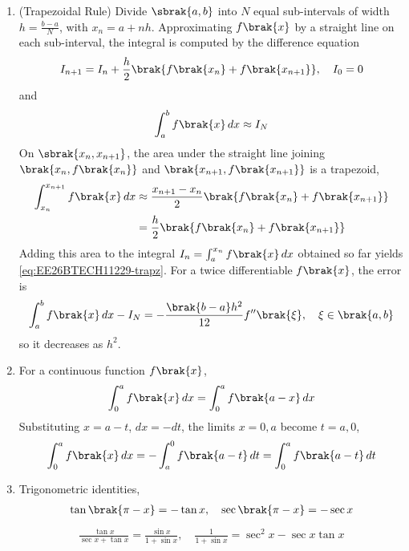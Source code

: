 \begin{enumerate}[label=\thesubsection.\arabic*, ref=\thesubsection.\theenumi]
\item (Trapezoidal Rule) Divide $\sbrak{a, b}$ into $N$ equal sub-intervals of width $h = \frac{b - a}{N}$, with $x_n = a + nh$. Approximating $f\brak{x}$ by a straight line on each sub-interval, the integral is computed by the difference equation
\begin{align}
	I_{n+1} = I_n + \frac{h}{2}\brak{f\brak{x_n} + f\brak{x_{n+1}}}, \quad I_0 = 0
	\label{eq:EE26BTECH11229-trapz}
\end{align}
and
\begin{align}
	\int_{a}^{b}f\brak{x}\, dx \approx I_N
\end{align}
\solution
On $\sbrak{x_n, x_{n+1}}$, the area under the straight line joining $\brak{x_n, f\brak{x_n}}$ and $\brak{x_{n+1}, f\brak{x_{n+1}}}$ is a trapezoid,
\begin{align}
	\int_{x_n}^{x_{n+1}}f\brak{x}\, dx &\approx \frac{x_{n+1} - x_n}{2}\brak{f\brak{x_n} + f\brak{x_{n+1}}}
	\nonumber \\
	&= \frac{h}{2}\brak{f\brak{x_n} + f\brak{x_{n+1}}}
\end{align}
Adding this area to the integral $I_n = \int_{a}^{x_n}f\brak{x}\, dx$ obtained so far yields \eqref{eq:EE26BTECH11229-trapz}. For a twice differentiable $f\brak{x}$, the error is
\begin{align}
	\int_{a}^{b}f\brak{x}\, dx - I_N = -\frac{\brak{b - a}h^2}{12}f^{\prime\prime}\brak{\xi}, \quad \xi \in \brak{a, b}
\end{align}
so it decreases as $h^2$.
\item For a continuous function $f\brak{x}$,
\begin{align}
	\int_{0}^{a}f\brak{x}\, dx = \int_{0}^{a}f\brak{a - x}\, dx
	\label{eq:EE26BTECH11229-prop-int}
\end{align}
\solution
Substituting $x = a - t$, $dx = -dt$, the limits $x = 0, a$ become $t = a, 0$,
\begin{align}
	\int_{0}^{a}f\brak{x}\, dx = -\int_{a}^{0}f\brak{a - t}\, dt = \int_{0}^{a}f\brak{a - t}\, dt
\end{align}
\item Trigonometric identities,
\begin{align}
	\tan\brak{\pi - x} = -\tan x, \quad \sec\brak{\pi - x} = -\sec x
	\label{eq:EE26BTECH11229-trig-pi}
\end{align}
\begin{align}
	\frac{\tan x}{\sec x + \tan x} = \frac{\sin x}{1 + \sin x}, \quad
	\frac{1}{1 + \sin x} = \sec^2 x - \sec x\tan x
	\label{eq:EE26BTECH11229-trig-id}

\end{align}
\end{enumerate}
